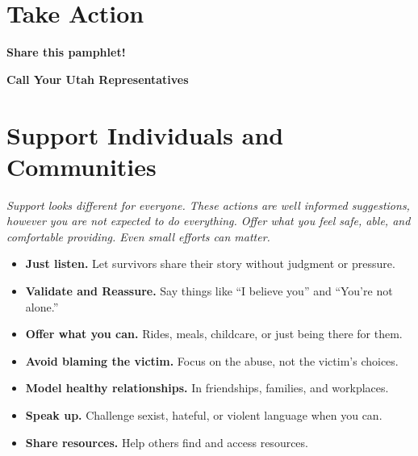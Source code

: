\documentclass[12pt]{article}
\begin{document}
\newpage

\section*{Take Action}
\begin{tcolorbox}[mybox]
\begin{multicols}{2}

\begin{center}
\textbf{Share this pamphlet!}\\[.5em]
\end{center}

\columnbreak

\begin{center}
\textbf{Call Your Utah Representatives}\\[.5em]
\end{center}



\end{multicols}
\end{tcolorbox}

\vspace{.5em}
\section*{Support Individuals and Communities}
\begin{tcolorbox}[mybox]
{\small
\textit{Support looks different for everyone. These actions are well informed suggestions, however you are not expected to do everything. Offer what you feel safe, able, and comfortable providing. Even small efforts can matter.}
}
\vspace{1em}
\begin{itemize}[leftmargin=1em]
  \item \textbf{Just listen.} Let survivors share their story without judgment or pressure.
  \item \textbf{Validate and Reassure.} Say things like “I believe you” and “You’re not alone.”
  \item \textbf{Offer what you can.} Rides, meals, childcare, or just being there for them.
  \item \textbf{Avoid blaming the victim.} Focus on the abuse, not the victim’s choices.
  \item \textbf{Model healthy relationships.} In friendships, families, and workplaces.
  \item \textbf{Speak up.} Challenge sexist, hateful, or violent language when you can.
  \item \textbf{Share resources.} Help others find and access resources.
\end{itemize}
\end{tcolorbox}
\end{document}
